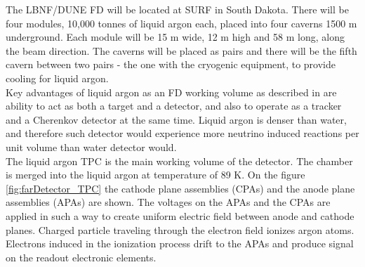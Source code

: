 The LBNF/DUNE FD will be located at SURF in South Dakota. There will be four modules, 10,000 tonnes of liquid argon each, placed into four caverns 1500 m underground. Each module will be 15 m wide, 12 m high and 58 m long, along the beam direction. The caverns will be placed as pairs and there will be the fifth cavern between two pairs - the one with the cryogenic equipment, to provide cooling for liquid argon.\\ 

Key advantages of liquid argon as an FD working volume as described in \cite{ref_aboutLAr} are ability to act as both a target and a detector, and also to operate as a tracker and a Cherenkov detector at the same time. Liquid argon is denser than water, and therefore such detector would experience more neutrino induced reactions per unit volume than water detector would. \\

The liquid argon TPC is the main working volume of the detector. The chamber is merged into the liquid argon at temperature of 89 K. On the figure \ref{fig:farDetector_TPC} the cathode plane assemblies (CPAs) and the anode plane assemblies (APAs) are shown. The voltages on the APAs and the CPAs are applied in such a way to create uniform electric field between anode and cathode planes. Charged particle traveling through the electron field ionizes argon atoms. Electrons induced in the ionization process drift to the APAs and produce signal on the readout electronic elements.


